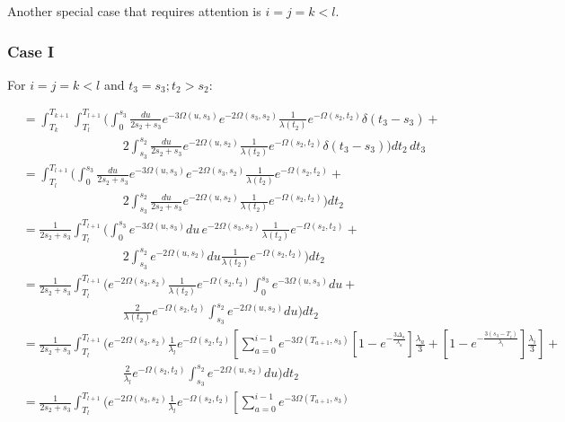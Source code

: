 \documentclass{article}
\begin{document}
Another special case that requires attention is $i=j=k<l$.

\subsubsection{Case I}
For $i=j=k<l$ and $t_3=s_3;t_2>s_2$:

\begin{align*}
    &=\int_{T_k}^{T_{k+1}}\int_{T_l}^{T_{l+1}}\Bigg(
    \int_0^{s_3}\frac{du}{2s_2+s_3}e^{-3\Omega(u,s_3)}e^{-2\Omega(s_3,s_2)}\frac{1}{\lambda(t_2)}e^{-\Omega(s_2,t_2)}\delta(t_3-s_3)+\\
    &\qquad\qquad\qquad\qquad
    2\int_{s_3}^{s_2}\frac{du}{2s_2+s_3}e^{-2\Omega(u,s_2)}\frac{1}{\lambda(t_2)}e^{-\Omega(s_2,t_2)}\delta(t_3-s_3)
    \Bigg)dt_2\,dt_3\\
    &=\int_{T_l}^{T_{l+1}}\Bigg(
    \int_0^{s_3}\frac{du}{2s_2+s_3}e^{-3\Omega(u,s_3)}e^{-2\Omega(s_3,s_2)}\frac{1}{\lambda(t_2)}e^{-\Omega(s_2,t_2)}+\\
    &\qquad\qquad\qquad\qquad
    2\int_{s_3}^{s_2}\frac{du}{2s_2+s_3}e^{-2\Omega(u,s_2)}\frac{1}{\lambda(t_2)}e^{-\Omega(s_2,t_2)}
    \Bigg)dt_2\\
    &=\frac{1}{2s_2+s_3}\int_{T_l}^{T_{l+1}}\Bigg(
    \int_0^{s_3}e^{-3\Omega(u,s_3)}du\,e^{-2\Omega(s_3,s_2)}\frac{1}{\lambda(t_2)}e^{-\Omega(s_2,t_2)}+\\
    &\qquad\qquad\qquad\qquad
    2\int_{s_3}^{s_2}e^{-2\Omega(u,s_2)}du\frac{1}{\lambda(t_2)}e^{-\Omega(s_2,t_2)}
    \Bigg)dt_2\\
    &=\frac{1}{2s_2+s_3}\int_{T_l}^{T_{l+1}}\Bigg(
    e^{-2\Omega(s_3,s_2)}\frac{1}{\lambda(t_2)}e^{-\Omega(s_2,t_2)}\int_0^{s_3}e^{-3\Omega(u,s_3)}du+\\
    &\qquad\qquad\qquad\qquad
    \frac{2}{\lambda(t_2)}e^{-\Omega(s_2,t_2)}\int_{s_3}^{s_2}e^{-2\Omega(u,s_2)}du
    \Bigg)dt_2\\
    &=\frac{1}{2s_2+s_3}\int_{T_l}^{T_{l+1}}\Bigg(
    e^{-2\Omega(s_3,s_2)}\frac{1}{\lambda_l}e^{-\Omega(s_2,t_2)}\left[\sum_{a=0}^{i-1} e^{-3\Omega(T_{a+1},s_3)}
    \left[1-e^{-\frac{3 \Delta_a}{\lambda_a}}\right]\frac{\lambda_a}{3}+
    \left[1-e^{-\frac{3 \left(s_3-T_{i}\right)}{\lambda_{i}}}\right]\frac{\lambda_{i}}{3}\right]+\\
    &\qquad\qquad\qquad\qquad
    \frac{2}{\lambda_l}e^{-\Omega(s_2,t_2)}\int_{s_3}^{s_2}e^{-2\Omega(u,s_2)}du
    \Bigg)dt_2\\
    &=\frac{1}{2s_2+s_3}\int_{T_l}^{T_{l+1}}\Bigg(
    e^{-2\Omega(s_3,s_2)}\frac{1}{\lambda_l}e^{-\Omega(s_2,t_2)}\left[\sum_{a=0}^{i-1} e^{-3\Omega(T_{a+1},s_3)}

\end{align*}
\end{document}
